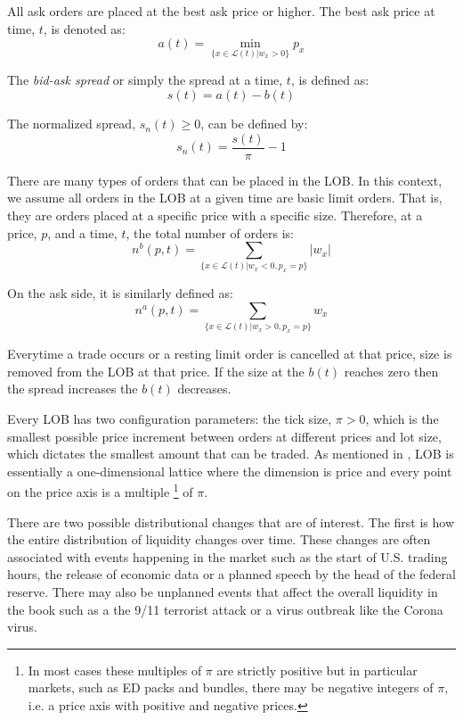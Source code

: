 All ask orders are placed at the best ask price or higher. The best ask price at time, $t$, is denoted as:
\begin{equation}
a(t) = \min_{\{x \in \mathcal{L}(t)|w_x>0 \}} p_x
\end{equation}

The \textit{bid-ask spread} or simply the spread at a time, $t$, is defined as:
\begin{equation}
s(t) = a(t) - b(t)
\end{equation}

The normalized spread, $s_n(t) \geq 0$, can be defined by: 
\begin{equation}
s_n(t) = \frac{s(t)}{\pi} - 1
\end{equation}

There are many types of orders that can be placed in the LOB. In this context, we assume all orders in the LOB at a given time are basic limit orders. That is, they are orders placed at a specific price with a specific size. Therefore, at a price, $p$, and a time, $t$, the total number of orders is:
\begin{equation}
n^b(p, t) = \sum_{\{x \in \mathcal{L}(t)|w_x<0 , p_x=p\}} |w_x|
\end{equation}

On the ask side, it is similarly defined as:
\begin{equation}
n^a(p, t) = \sum_{\{x \in \mathcal{L}(t)|w_x>0 , p_x=p\}}  w_x
\end{equation}

Everytime a trade occurs or a resting limit order is cancelled at that price, size is removed from the LOB at that price. If the size at the $b(t)$ reaches zero then the spread increases the $b(t)$ decreases. 

Every LOB has two configuration parameters: the tick size, $\pi >0$, which is the smallest possible price increment between orders at different prices and lot size, which dictates the smallest amount that can be traded. As mentioned in \cite{gould2016queue}, LOB is essentially a one-dimensional lattice where the dimension is price and every point on the price axis is a multiple \footnote{In most cases these multiples of $\pi$ are strictly positive but in particular markets, such as ED packs and bundles, there may be negative integers of $\pi$, i.e. a price axis with positive and negative prices.} of $\pi$.

There are two possible distributional changes that are of interest. The first is how the entire distribution of liquidity changes over time. These changes are often associated with events happening in the market such as the start of U.S. trading hours, the release of economic data or a planned speech by the head of the federal reserve. There may also be unplanned events that affect the overall liquidity in the book such as a the 9/11 terrorist attack or a virus outbreak like the Corona virus.

